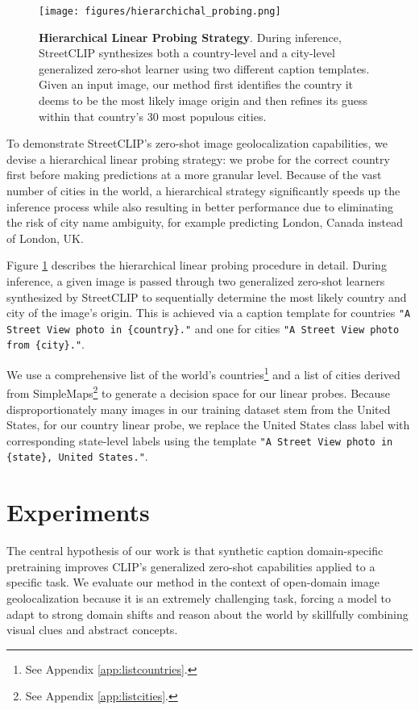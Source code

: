 \documentclass{article}
\begin{document}
\begin{figure}[htb]
\vskip 0.2in
\begin{center}
\centerline{\texttt{[image: figures/hierarchichal\_probing.png]}}
\caption{\textbf{Hierarchical Linear Probing Strategy}. During inference, StreetCLIP synthesizes both a country-level and a city-level generalized zero-shot learner using two different caption templates. Given an input image, our method first identifies the country it deems to be the most likely image origin and then refines its guess within that country's 30 most populous cities.}
\label{fig:linear_probe}
\end{center}
\vskip -0.1in
\end{figure}

To demonstrate StreetCLIP's zero-shot image geolocalization capabilities, we devise a hierarchical linear probing strategy: we probe for the correct country first before making predictions at a more granular level. Because of the vast number of cities in the world, a hierarchical strategy significantly speeds up the inference process while also resulting in better performance due to eliminating the risk of city name ambiguity, for example predicting London, Canada instead of London, UK. 

Figure \ref{fig:linear_probe} describes the hierarchical linear probing procedure in detail. During inference, a given image is passed through two generalized zero-shot learners synthesized by StreetCLIP to sequentially determine the most likely country and city of the image's origin. This is achieved via a caption template for countries \texttt{"A Street View photo in \{country\}."} and one for cities \texttt{"A Street View photo from \{city\}."}.

We use a comprehensive list of the world's countries\footnote{See Appendix \ref{app:listcountries}.} and a list of cities derived from SimpleMaps\footnote{See Appendix \ref{app:listcities}.} to generate a decision space for our linear probes. Because disproportionately many images in our training dataset stem from the United States, for our country linear probe, we replace the United States class label with corresponding state-level labels using the template \texttt{"A Street View photo in \{state\}, United States."}.


\section{Experiments}

The central hypothesis of our work is that synthetic caption domain-specific pretraining improves CLIP's generalized zero-shot capabilities applied to a specific task. We evaluate our method in the context of open-domain image geolocalization because it is an extremely challenging task, forcing a model to adapt to strong domain shifts and reason about the world by skillfully combining visual clues and abstract concepts. 
\end{document}
